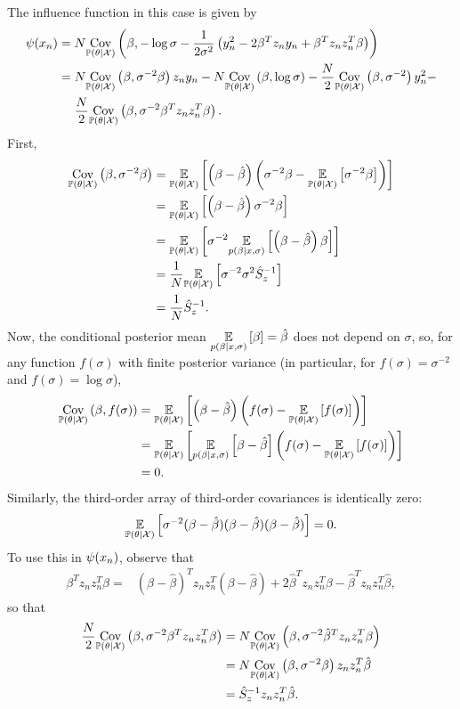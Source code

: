 The influence function in this case is given by
%
\begin{align*}
%
\infl(\x_n) ={}&
    N \cov{\post}{\beta,
    -\log \sigma
    -\frac{1}{2\sigma^2}\left(y_n^2 - 2 \beta^T z_n y_n +
                             \beta^T z_n z_n^T \beta \right)} \\
={}& N \cov{\post}{\beta, \sigma^{-2} \beta} z_n y_n -
N \cov{\post}{\beta, \log \sigma} -
\frac{N}{2} \cov{\post}{\beta, \sigma^{-2}} y_n^2 -
\\&
\frac{N}{2} \cov{\post}{\beta, \sigma^{-2} \beta^T z_n z_n^T \beta}.
%
\end{align*}
%
First,
%
\begin{align*}
%
\cov{\post}{\beta, \sigma^{-2} \beta} ={}&
\expect{\post}{
    \left(\beta - \hat\beta \right)
    \left(\sigma^{-2} \beta - \expect{\post}{\sigma^{-2} \beta}\right)}
\\ ={}&
\expect{\post}{\left(\beta - \hat\beta \right) \sigma^{-2} \beta}
\\ ={}&
\expect{\post}{
    \sigma^{-2}
    \expect{p(\beta \vert \x, \sigma)}{\left(\beta - \hat\beta \right) \beta}
    }
\\ ={}&
\frac{1}{N} \expect{\post}{\sigma^{-2} \sigma^2 \hat{S}_z^{-1}}
\\ ={}& \frac{1}{N} \hat{S}_z^{-1}.
%
\end{align*}
%
Now, the conditional posterior mean $\underset{p(\beta \vert x, \sigma)}{\mathbb{E}}\left[\beta\right] =
\hat\beta$ does not depend on $\sigma$, so, for any function $f(\sigma)$ with
finite posterior variance (in particular, for $f(\sigma) = \sigma^{-2}$ and $f(\sigma)
= \log \sigma$),
%
\begin{align*}
%
\cov{\post}{\beta, f(\sigma)} ={}&
\expect{\post}{\left(\beta - \hat\beta\right)
               \left( f(\sigma) - \expect{\post}{f(\sigma)}\right)} \\
={}&
\expect{\post}{\expect{p(\beta \vert \x, \sigma)}{\beta - \hat\beta}
               \left( f(\sigma) - \expect{\post}{f(\sigma)}\right)} \\
={}& 0.
%
\end{align*}
%
Similarly, the third-order array of third-order covariances is identically zero:
%
\begin{align*}
%
\expect{\post}{\sigma^{-2}(
    \beta - \hat\beta)(\beta - \hat\beta)(\beta - \hat\beta)}
= 0.
%
\end{align*}
%
To use this in $\psi(x_n)$, observe that
%
\begin{align*}
%
\beta^T z_n z_n^T \beta ={}&
    \left(\beta - \hat\beta\right)^T z_n z_n^T \left(\beta - \hat\beta\right) +
    2 \hat\beta^T z_n z_n^T \beta -
    \hat\beta^T z_n z_n^T \hat\beta,
%
\end{align*}
%
so that
%
\begin{align*}
%
\frac{N}{2} \cov{\post}{\beta, \sigma^{-2} \beta^T z_n z_n^T \beta} ={}&
N \cov{\post}{\beta, \sigma^{-2} \hat\beta^T z_n z_n^T \beta}
\\={}&
N \cov{\post}{\beta, \sigma^{-2} \beta} z_n z_n^T \hat\beta
\\={}&
\hat{S}_z^{-1} z_n z_n^T \hat\beta.
%
\end{align*}
%

